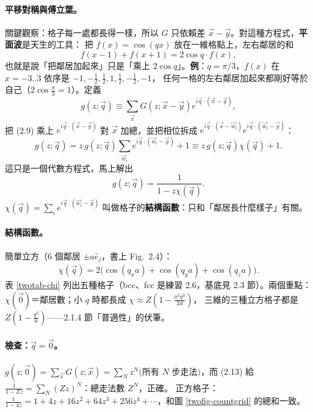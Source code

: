 \paragraph{平移對稱與傅立葉。}
關鍵觀察：格子每一處都長得一樣，所以 $G$ 只依賴差 $\vec x-\vec y$。對這種方程式，\textbf{平面波}是天生的工具：
把 $f(x)=\cos(qx)$ 放在一維格點上，左右鄰居的和
\[f(x-1)+f(x+1)=2\cos q\cdot f(x),\]
也就是說「把鄰居加起來」只是「乘上 $2\cos q$」。\textbf{例}：$q=\pi/3$，$f(x)$ 在 $x=-3..3$ 依序是 $-1,-\frac12,\frac12,1,\frac12,-\frac12,-1$，
任何一格的左右鄰居加起來都剛好等於自己（$2\cos\frac\pi3=1$）。定義
\[g(z;\vec q)\equiv\sum_{\vec x}G(z;\vec x-\vec y)e^{i\vec q\cdot(\vec x-\vec y)},\tag{2.10}\]
把 (2.9) 乘上 $e^{i\vec q\cdot(\vec x-\vec y)}$ 對 $\vec x$ 加總，並把相位拆成 $e^{i\vec q\cdot(\vec x-\vec w_i)}e^{i\vec q\cdot(\vec w_i-\vec y)}$：
\[g(z;\vec q)=z\,g(z;\vec q)\sum_{\vec w_i}e^{i\vec q\cdot(\vec w_i-\vec y)}+1\equiv z\,g(z;\vec q)\chi(\vec q)+1.\tag{2.11}\]
這只是一個代數方程式，馬上解出
\[g(z;\vec q)=\frac1{1-z\chi(\vec q)}.\tag{2.13}\]
$\chi(\vec q)=\sum_ie^{i\vec q\cdot(\vec w_i-\vec y)}$ 叫做格子的\textbf{結構函數}：只和「鄰居長什麼樣子」有關。

\paragraph{結構函數。}
簡單立方（6 個鄰居 $\pm a\hat e_j$，書上 Fig.~2.4）：
\[\chi(\vec q)=2\big(\cos(q_xa)+\cos(q_ya)+\cos(q_za)\big).\tag{2.12}\]
表 \ref{twotab-chi} 列出五種格子（bcc、fcc 是練習 2.6，基底見 2.3 節）。兩個重點：$\chi(\vec0)$＝鄰居數；小 $q$ 時都長成 $\chi\approx Z(1-\frac{a^2q^2}{2d})$，
三維的三種立方格子都是 $Z(1-\frac{q^2}{6})$——2.1.4 節「普適性」的伏筆。
\begin{table}[H]
\centering
\caption{結構函數（$a$＝最近鄰距離＝1）。「二部圖」：格點能分成黑白兩組、每步都換顏色（就會有奇偶性）}\label{twotab-chi}
\TwoTabChi
\end{table}

\paragraph{檢查：$\vec q=\vec0$。}
$g(z;\vec0)=\sum_{\vec x}G(z;\vec x)=\sum_Nz^N\big(\text{所有 }N\text{ 步走法}\big)$，而 (2.13) 給 $\frac1{1-Zz}=\sum_N(Zz)^N$：總走法數 $Z^N$，正確。
正方格子：$\frac1{1-4z}=1+4z+16z^2+64z^3+256z^4+\cdots$，和圖 \ref{twofig-countgrid} 的總和一致。

